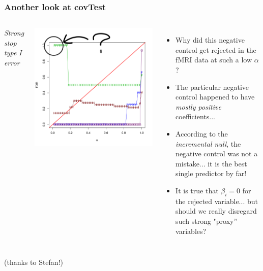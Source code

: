 \documentclass{beamer}
\begin{document}
\begin{frame}
\frametitle{Another look at covTest}
 \begin{columns}[c]
     \emph{Strong stop type I error}

     \includegraphics[scale = 0.4]{res_c_ss_type1_comment.png}
     \begin{itemize}
       \item<1> Why did this negative control get rejected in the fMRI data at such a low $\alpha$?
       \item<1> The particular negative control happened to have \emph{mostly positive} coefficients... 
       \item<2> According to the \emph{incremental null}, the negative control was not a mistake... it is the best single predictor by far!
       \item<3> It is true that $\beta_i = 0$ for the rejected variable... but should we really disregard such strong "proxy'' variables?
     \end{itemize}
 \end{columns}
(thanks to Stefan!)
\end{frame}
\end{document}
